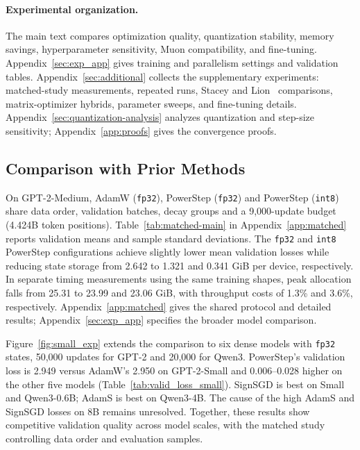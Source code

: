 \documentclass{article}
\begin{document}
\paragraph{Experimental organization.}
The main text compares optimization quality, quantization stability, memory savings, hyperparameter sensitivity, Muon compatibility, and fine-tuning. Appendix~\ref{sec:exp_app} gives training and parallelism settings and validation tables. Appendix~\ref{sec:additional} collects the supplementary experiments: matched-study measurements, repeated runs, Stacey and Lion~\citep{chen2024symbolic} comparisons, matrix-optimizer hybrids, parameter sweeps, and fine-tuning details. Appendix~\ref{sec:quantization-analysis} analyzes quantization and step-size sensitivity; Appendix~\ref{app:proofs} gives the convergence proofs.

\subsection{Comparison with Prior Methods}\label{sec:comparison}\label{app:trajectories}
On GPT-2-Medium, AdamW (\texttt{fp32}), PowerStep (\texttt{fp32}) and PowerStep (\texttt{int8}) share data order, validation batches, decay groups and a 9,000-update budget (4.424B token positions). Table~\ref{tab:matched-main} in Appendix~\ref{app:matched} reports validation means and sample standard deviations. The \texttt{fp32} and \texttt{int8} PowerStep configurations achieve slightly lower mean validation losses while reducing state storage from 2.642 to 1.321 and 0.341 GiB per device, respectively. In separate timing measurements using the same training shapes, peak allocation falls from 25.31 to 23.99 and 23.06 GiB, with throughput costs of 1.3\% and 3.6\%, respectively. Appendix~\ref{app:matched} gives the shared protocol and detailed results; Appendix~\ref{sec:exp_app} specifies the broader model comparison.

Figure~\ref{fig:small_exp} extends the comparison to six dense models with \texttt{fp32} states, 50,000 updates for GPT-2 and 20,000 for Qwen3. PowerStep's validation loss is 2.949 versus AdamW's 2.950 on GPT-2-Small and 0.006--0.028 higher on the other five models (Table~\ref{tab:valid_loss_small}). SignSGD is best on Small and Qwen3-0.6B; AdamS is best on Qwen3-4B. The cause of the high AdamS and SignSGD losses on 8B remains unresolved. Together, these results show competitive validation quality across model scales, with the matched study controlling data order and evaluation samples.
\end{document}
